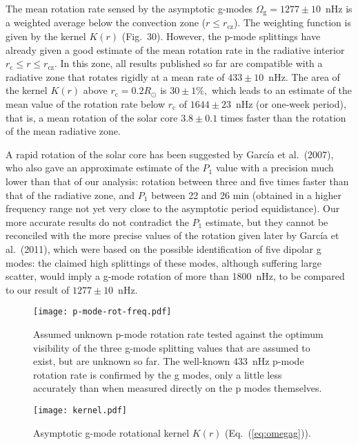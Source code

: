 \documentclass[bibyear]{aa}
\begin{document}
 The mean rotation rate sensed by the asymptotic g-modes 
$\Omega_\mathrm{g}=1277\pm 10$~nHz  is a weighted average below the convection zone ($r\le r_\mathrm{cz}$).
The weighting function is given by the kernel $K(r)$ (Fig.~30). However, the p-mode splittings have 
already given a good estimate of the mean rotation rate in the radiative interior  
$r_\mathrm{c}\le r\le r_\mathrm{cz}$.  In this  zone, all results published so far are compatible with a 
radiative zone that rotates rigidly  at a mean rate of $433\pm 10$~nHz. 
The area of the kernel $K(r)$ above $r_\mathrm{c}=0.2 R_\odot$ is $30\pm 1\%,$ which leads to an estimate of 
the  mean value of the rotation rate  below $r_\mathrm{c}$ of 
$1644\pm 23$~nHz  (or one-week period), that is, a mean rotation of the solar core $3.8\pm0.1$ times faster than the rotation of the mean radiative zone.



A rapid rotation of the solar core has been suggested by  Garc\'ia et al.~(2007), who also gave an approximate estimate of the $P_1$ value with a precision much lower than that of our analysis: rotation between three and five  times faster than that of the radiative zone, and  $P_1$ between 22 and 26 min (obtained in a higher frequency range not yet very close to the asymptotic period equidistance). Our more accurate results do not contradict the $P_1$ estimate, but they cannot be reconciled with the more precise values of the rotation given later by Garc\'ia et al.~(2011), which were based on the possible identification of five dipolar g modes: the claimed high splittings of these modes, although suffering large scatter,  would imply a g-mode rotation of more than 1800~nHz, to be compared to our result of $1277\pm 10$~nHz.  



\begin{figure}
\centering
\texttt{[image: p-mode-rot-freq.pdf]}
\caption{Assumed unknown p-mode rotation rate tested against the optimum visibility of the three  g-mode splitting values that are assumed to exist, but are
unknown so far. The well-known 433~nHz p-mode rotation rate is confirmed by the g modes, only a little less accurately than when measured directly on the p modes themselves.}
\label{fig:maxScor}
\end{figure} 

\begin{figure}
\centering
\texttt{[image: kernel.pdf]}
\caption{Asymptotic g-mode rotational kernel $K(r)$ (Eq.~(\ref{eq:omegag})).}
\label{fig:K}
\end{figure} 
\end{document}
